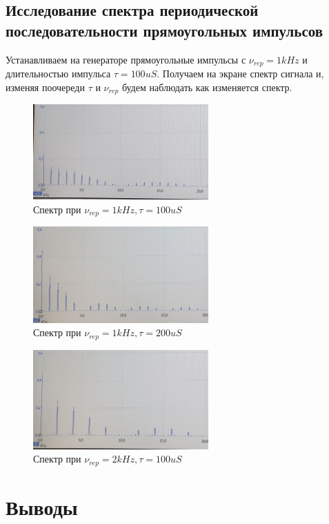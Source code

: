 \documentclass{article}
\begin{document}
\subsection{Исследование спектра периодической последовательности прямоугольных импульсов}

Устанавливаем на генераторе прямоугольные импульсы с \( \nu_{rep} = 1kHz \) и длительностью импульса
\( \tau = 100uS \). Получаем на экране спектр сигнала и, изменяя поочереди $\tau$ и $\nu_{rep}$ будем
наблюдать как изменяется спектр.

\begin{figure}[H]
    \centering
    \includegraphics[width=0.6\textwidth]{1.jpg}
    \caption{Спектр при \( \nu_{rep} = 1 kHz, \tau = 100uS \)}
    \label{spec_1}
\end{figure}

\begin{figure}[H]
    \centering
    \includegraphics[width=0.6\textwidth]{2.jpg}
    \caption{Спектр при \( \nu_{rep} = 1 kHz, \tau = 200uS \)} 
    \label{spec_2}
\end{figure}

\begin{figure}[H]
    \centering
    \includegraphics[width=0.6\textwidth]{3.jpg}
    \caption{Спектр при \( \nu_{rep} = 2 kHz, \tau = 100uS \)} 
    \label{spec_3}
\end{figure}


\section{Выводы}
\end{document}
